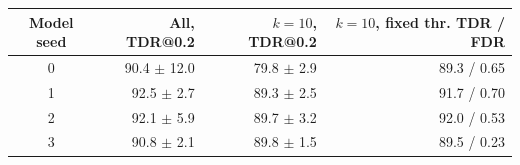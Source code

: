\begin{tabular}{c rrr}
\toprule
Model seed & All, TDR@0.2 & $k{=}10$, TDR@0.2 & $k{=}10$, fixed thr. TDR / FDR \\
\midrule
0 & 90.4 $\pm$ 12.0 & 79.8 $\pm$ 2.9 & 89.3 / 0.65 \\
1 & 92.5 $\pm$ 2.7 & 89.3 $\pm$ 2.5 & 91.7 / 0.70 \\
2 & 92.1 $\pm$ 5.9 & 89.7 $\pm$ 3.2 & 92.0 / 0.53 \\
3 & 90.8 $\pm$ 2.1 & 89.8 $\pm$ 1.5 & 89.5 / 0.23 \\
\bottomrule
\end{tabular}
